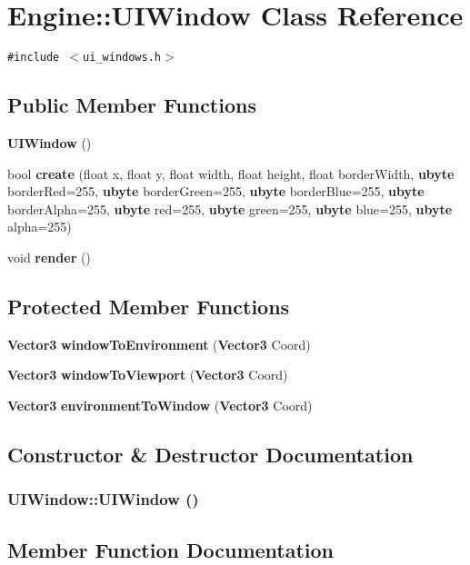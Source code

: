 \section{Engine::UIWindow Class Reference}
\label{classEngine_1_1UIWindow}
{\tt \#include $<$ui\_\-windows.h$>$}

\subsection*{Public Member Functions}
\begin{CompactItemize}
\item 
{\bf UIWindow} ()
\item 
bool {\bf create} (float x, float y, float width, float height, float borderWidth, {\bf ubyte} borderRed=255, {\bf ubyte} borderGreen=255, {\bf ubyte} borderBlue=255, {\bf ubyte} borderAlpha=255, {\bf ubyte} red=255, {\bf ubyte} green=255, {\bf ubyte} blue=255, {\bf ubyte} alpha=255)
\item 
void {\bf render} ()
\end{CompactItemize}
\subsection*{Protected Member Functions}
\begin{CompactItemize}
\item 
{\bf Vector3} {\bf windowToEnvironment} ({\bf Vector3} Coord)
\item 
{\bf Vector3} {\bf windowToViewport} ({\bf Vector3} Coord)
\item 
{\bf Vector3} {\bf environmentToWindow} ({\bf Vector3} Coord)
\end{CompactItemize}


\subsection{Constructor \& Destructor Documentation}
\subsubsection{\setlength{\rightskip}{0pt plus 5cm}UIWindow::UIWindow ()}\label{classEngine_1_1UIWindow_1e956e65a67715122de56e90ffd0bd84}




\subsection{Member Function Documentation}
